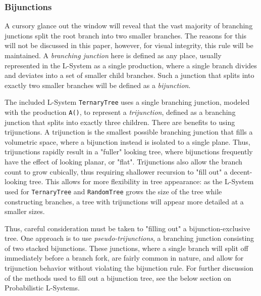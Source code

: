 \documentclass{article}
\newcommand{\tab}{\hspace*{2em}}
\begin{document}
            \subsubsection{Bijunctions}
    \tab A cursory glance out the window will reveal that the vast majority of branching junctions
split the root branch into two smaller branches. The reasons for this will not be discussed in this
paper, however, for visual integrity, this rule will be maintained. A \emph{branching junction}
here is defined as any place, usually represented in the L-System as a single production, where a
single branch divides and deviates into a set of smaller child branches. Such a junction that
splits into exactly two smaller branches will be defined as a \emph{bijunction}.

    \tab The included L-System \verb|TernaryTree| uses a single branching junction, modeled with
the production \verb|A()|, to represent a \emph{trijunction}, defined as a branching junction that
splits into exactly three children\cite{abp96}. There are benefits to using trijunctions. A
trijunction is the smallest possible branching junction that fills a volumetric space, where a
bijunction instead is isolated to a single plane. Thus, trijunctions rapidly result in a "fuller"
looking tree, where bijunctions frequently have the effect of looking planar, or "flat".
Trijunctions also allow the branch count to grow cubically, thus requiring shallower recursion
to "fill out" a decent-looking tree. This allows for more flexibility in tree appearance: as the
L-System used for \verb|TernaryTree| and \verb|RandomTree| grows the size of the tree while
constructing branches, a tree with trijunctions will appear more detailed at a smaller sizes.

    \tab Thus, careful consideration must be taken to "filling out" a bijunction-exclusive tree.
One approach is to use \emph{pseudo-trijunctions}, a branching junction consisting of two stacked
bijunctions. These junctions, where a single branch will split off immediately before a branch
fork, are fairly common in nature, and allow for trijunction behavior without violating the
bijunction rule. For further discussion of the methods used to fill out a bijunction tree, see the
below section on Probabilistic L-Systems.

\end{document}
